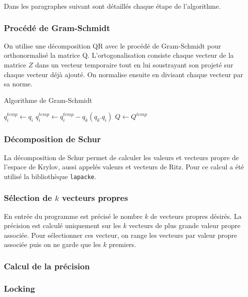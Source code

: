 \documentclass[11pt,a4paper]{article}
\begin{document}
		Dans les paragraphes suivant sont détaillés chaque étape de l'algorithme.

		\subsubsection{Procédé de Gram-Schmidt}

			On utilise une décomposition QR avec le procédé de Gram-Schmidt pour orthonormalisé la matrice Q. L'ortogonalisation consiste chaque vecteur de la matrice $Z$ dans un vecteur temporaire tout en lui soustrayant son projeté sur chaque vecteur déjà ajouté. On normalise ensuite en divisant chaque vecteur par sa norme.

			\begin{algorithm}
				\caption{Algorithme de Gram-Schmidt}
				\begin{algorithmic}[1]
						\State $q^{temp}_i \gets q_i$
						\State $q^{temp}_i \gets q^{temp}_i - q_k(q_k.q_i)$
						\EndFor
					\EndFor
					\State $Q \gets Q^{temp}$
				\end{algorithmic}
			\end{algorithm}

		\subsubsection{Décomposition de Schur}

		La décomposition de Schur permet de calculer les valeurs et vecteurs propre de l'espace de Krylov, aussi appelés valeurs et vecteurs de Ritz. Pour ce calcul a été utilisé la bibliothèque \texttt{lapacke}.

		\subsubsection{Sélection de $k$ vecteurs propres}

			En entrée du programme est précisé le nombre $k$ de vecteurs propres désirés. La précision est calculé uniquement sur les $k$ vecteurs de plus grande valeur propre associée. Pour sélectionner ces vecteur, on range les vecteurs par valeur propre associée puis on ne garde que les $k$ premiers.

		\subsubsection{Calcul de la précision}

		\subsubsection{Locking}
\end{document}
